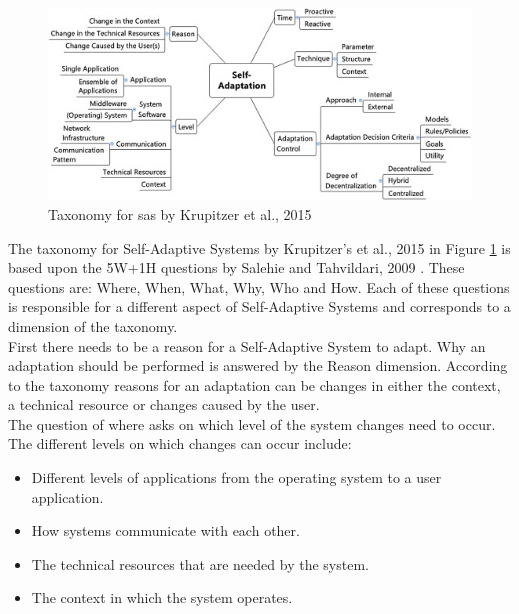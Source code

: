 \begin{figure}[hbt!]
    \includegraphics[width=\textwidth]{images/KrupitzerTaxonomy.jpg}
    \caption{Taxonomy for \acrlong{sas} by Krupitzer et al., 2015 \cite*{SurveyOnEngineeringApproaches}}
    \label{fig:KrupitzerTaxonomy}
\end{figure}

\par
The taxonomy for Self-Adaptive Systems by Krupitzer's et al., 2015 \cite*{SurveyOnEngineeringApproaches} in Figure \ref{fig:KrupitzerTaxonomy}
is based upon the 5W+1H questions by Salehie and Tahvildari, 2009 \cite*{LandscapeAndResearchChallenges}.
These questions are: Where, When, What, Why, Who and How.
Each of these questions is responsible for a different aspect of Self-Adaptive Systems and corresponds to a dimension of the taxonomy. \\


First there needs to be a reason for a Self-Adaptive System to adapt.
Why an adaptation should be performed is answered by the Reason dimension.
According to the taxonomy reasons for an adaptation can be changes in either the context, a technical resource or changes caused by the user. \\

The question of where asks on which level of the system changes need to occur.
The different levels on which changes can occur include:
\begin{itemize}
    \item Different levels of applications from the operating system to a user application.
    \item How systems communicate with each other.
    \item The technical resources that are needed by the system.
    \item The context in which the system operates.
\end{itemize}

